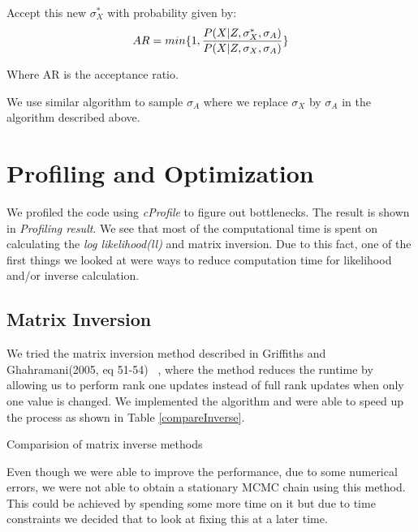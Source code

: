 \documentclass{article}
\begin{document}
Accept this new $\sigma_X^{*}$ with probability given by:
\begin{equation}
AR = min\{1,\frac{P(X|Z, \sigma_X^{*}, \sigma_A)}{P(X|Z, \sigma_X,\sigma_A)}\}\\
\end{equation}

Where AR is the acceptance ratio.

We use similar algorithm to sample $\sigma_A$ where we replace $\sigma_X$ by $\sigma_A$ in the algorithm described above.



\section{Profiling and Optimization}
We profiled the code using \textit{cProfile} to figure out bottlenecks. The result is shown in \textit{Profiling result}. We see that most of the computational time is spent on calculating the \textit{log likelihood(ll)}  and matrix inversion. Due to this fact, one of the first things we looked at were ways to reduce computation time for likelihood and/or inverse calculation.\\


\subsection{Matrix Inversion}
We tried the matrix inversion method described in Griffiths and Ghahramani(2005, eq 51-54) ~\cite{griffiths1}, where the method reduces the runtime by allowing us to perform rank one updates instead of full rank updates when only one value is changed. We implemented the algorithm and were able to speed up the process as shown in Table \ref{compareInverse}.

\begin{table}[ht]
\centering
\caption{Comparision of matrix inverse methods \label{compareInverse}}

\end{table}

Even though we were able to improve the performance, due to some numerical errors, we were not able to obtain a stationary MCMC chain using this method. This could be achieved by spending some more time on it but due to time constraints we decided that to look at fixing this at a later time.\\
\end{document}
